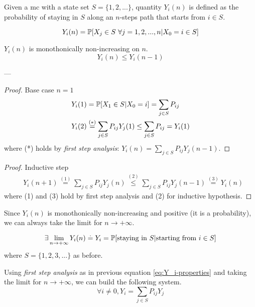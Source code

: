 	\begin{definition}
		Given a \gls{mc} with a state set $S = \{1, 2, ...\}$, quantity $Y_i(n)$ is defined as the probability of staying in $S$ along an $n$-steps path that starts from $i \in S$.

		$$ Y_i(n) = \mathbb{P}[X_j \in S ~\forall j=1, 2, ..., n | X_0 = i \in S] $$
	\end{definition}

	\begin{theorem}
		$Y_i(n)$ is monothonically non-increasing on $n$.
		$$ Y_i(n) \le Y_i(n-1) $$
	\end{theorem}
	---
	\begin{proof} Base case $n=1$
		\begin{equation}\begin{split} \label{eq:Y_i-properties}
			& Y_i(1) = \mathbb{P}[X_1 \in S | X_0 = i] = \sum_{j \in S} P_{ij} \\
			& Y_i(2) \stackrel{(*)}{=} \sum_{j \in S} P_{ij} Y_j(1) \le \sum_{j \in S} P_{ij} = Y_i(1)
		\end{split}\end{equation}
		where (*) holds by \emph{first step analysis}: $ Y_i(n) = \sum_{j \in S} P_{ij} Y_j(n-1) $.
	\end{proof}

	\begin{proof} Inductive step
		\begin{equation}\begin{split}
			& Y_i(n+1) \stackrel{(1)}{=} \sum_{j \in S} P_{ij} Y_j(n) \stackrel{(2)}{\le} \sum_{j \in S} P_{ij} Y_j(n-1) \stackrel{(3)}{=} Y_i(n)
		\end{split}\end{equation}
		where (1) and (3) hold by first step analysis and (2) for inductive hypothesis.
	\end{proof}

	\begin{lemma}
		Since $Y_i(n)$ is monothonically non-increasing and positive (it is a probability), we can always take the limit for $n \to +\infty$.

		$$ \exists \lim_{n \to +\infty} Y_i(n) \stackrel{.}{=} Y_i = \mathbb{P}[\text{staying in } S | \text{starting from } i \in S] $$
		where $ S = \{ 1, 2, 3, ...\} $ as before.

		Using \emph{first step analysis} as in previous equation \eqref{eq:Y_i-properties} and taking the limit for $n \to +\infty $, we can build the following system.
		\begin{equation} \label{eq:Yj_system}
			\forall i \neq 0, Y_i = \sum_{j \in S} P_{ij} Y_j
		\end{equation}
	\end{lemma}

